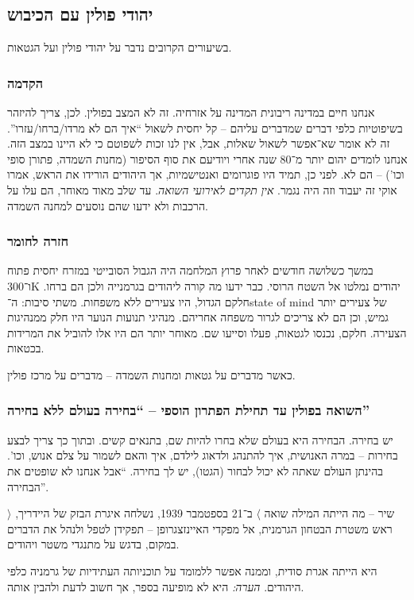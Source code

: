 \documentclass[]{article}
\newcommand\ra    {\rangle}
\newcommand\la    {\langle}
\theoremstyle{definition}
\begin{document}
    \subsection{יהודי פולין עם הכיבוש}
    בשיעורים הקרובים נדבר על יהודי פולין ועל הגטאות. 
    \subsubsection{הקדמה}
    אנחנו חיים במדינה ריבונית המדינה על אזרחיה. זה לא המצב בפולין. לכן, צריך להיזהר בשיפוטיות כלפי דברים שמדברים עליהם – קל יחסית לשאול ``איך הם לא מרדו/ברחו/עזרו''. זה לא אומר שא־אפשר לשאול שאלות, אבל, אין לנו זכות לשפוטם כי לא היינו במצב הזה. אנחנו לומדים יהום יותר מ־80 שנה אחרי ויודיעם את סוף הסיפור (מחנות השמדה, פתורן סופי וכו') – הם לא. לפני כן, תמיד היו פוגרומים ואנטישמיות, אך היהודים הורידו את הראש, אמרו אוקי זה יעבוד וזה היה נגמר. \textit{אין תקדים לאירועי השואה}. עד שלב מאוד מאוחר, הם עלו על הרכבות ולא ידעו שהם נוסעים למחנה השמדה. 
    
    \subsubsection{חזרה לחומר}
    במשך כשלושה חודשים לאחר פרוץ המלחמה היה הגבול הסובייטי במזרח יחסית פתוח ו־300K יהודים נמלטו אל השטח הרוסי. כבר ידעו מה קורה ליהודים בגרמנייה ולכן הם ברחו. חלקם הגדול, היו צעירים ללא משפחות. משתי סיבות: ה־state of mind של צעירים יותר גמיש, וכן הם לא צריכים לגרור משפחה אחריהם. מנהיגי תנועות הנוער היו חלק ממנהיגות הצעירה. חלקם, נכנסו לגטאות, פעלו וסייעו שם. מאוחר יותר הם היו אלו להוביל את המרידות בכטאות. 
    
    כאשר מדברים על גטאות ומחנות השמדה – מדברים על מרכז פולין. 
    \subsubsection{השואה בפולין עד תחילת הפתרון הוספי – ``בחירה בעולם ללא בחירה''}
    יש בחירה. הבחירה היא בעולם שלא בחרו להיות שם, בתנאים קשים. ובתוך כך צריך לבצע בחירות – במרה האנושית, איך להתנהג ולדאוג לילדם, איך והאם לשמור על צלם אנוש, וכו'. בהינתן העולם שאתה לא יכול לבחור (הגטו), יש לך בחירה. ``אבל אנחנו לא שופטים את הבחירה''. 
    
    $\ra$ שיר – מה הייתה המילה שואה $\la$
    ב־21 בספטמבר 1939, נשלחה איגרת הבזק של היידריך, ראש משטרת הבטחון הגרמנית, אל מפקדי האיינזצגרופן – תפקידן לטפל ולנהל את הדברים במקום, בדגש על מתנגדי משטר ויהודים. 
    
    היא הייתה אגרת סודית, וממנה אפשר ללמומד על תוכניותה העתידיות של גרמניה כלפי היהודים. \textit{הערה: }היא לא מופיעה בספר, אך חשוב לדעת ולהבין אותה. 
    
\end{document}
